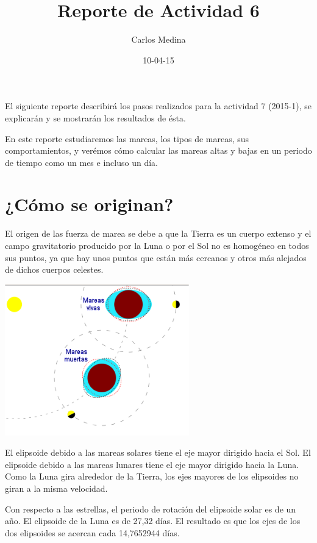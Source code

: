 \documentclass[12pt]{article}
\title{Reporte de Actividad 6}
\author{Carlos Medina}
\date{10-04-15}
\begin{document}
\maketitle


El siguiente reporte describirá los pasos realizados para la actividad 7 (2015-1), se explicarán y se mostrarán los resultados de ésta.




\hspace {0.5cm} En este reporte estudiaremos las mareas, los tipos de mareas, sus comportamientos, y verémos cómo calcular las mareas altas y bajas en un periodo de tiempo como un mes e incluso un día.

\section{¿Cómo se originan?}

El origen de las fuerza de marea se debe a que la Tierra es un cuerpo extenso y el campo gravitatorio producido por la Luna o por el Sol no es homogéneo en todos sus puntos, ya que hay unos puntos que están más cercanos y otros más alejados de dichos cuerpos celestes.

 
\begin{center}
	\includegraphics[width=8cm]{mar.png}\\
\end{center}
 
El elipsoide debido a las mareas solares tiene el eje mayor dirigido hacia el Sol. El elipsoide debido a las mareas lunares tiene el eje mayor dirigido hacia la Luna. Como la Luna gira alrededor de la Tierra, los ejes mayores de los elipsoides no giran a la misma velocidad.

	Con respecto a las estrellas, el periodo de rotación del elipsoide solar es de un año. El elipsoide de la Luna es de 27,32 días. El resultado es que los ejes de los dos elipsoides se acercan cada 14,7652944 días.
	
\end{document}
